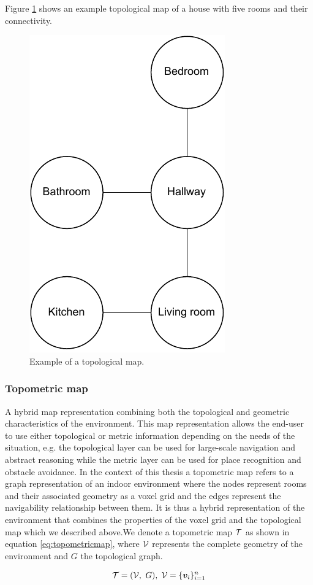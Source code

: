 Figure \ref{fig:topomap} shows an example topological map of a house with five rooms and their connectivity.

\begin{figure}[h]
    \centering
    \includegraphics*[width=.3\textwidth]{./fig/topological_map.pdf}
    \caption{Example of a topological map.}
    \label{fig:topomap}
\end{figure}

\pagebreak

\subsubsection{Topometric map}
A hybrid map representation combining both the topological and geometric characteristics of the environment. This map representation allows the end-user to use either topological or metric information depending on the needs of the situation, e.g. the topological layer can be used for large-scale navigation and abstract reasoning while the metric layer can be used for place recognition and obstacle avoidance. In the context of this thesis a topometric map refers to a graph representation of an indoor environment where the nodes represent rooms and their associated geometry as a voxel grid and the edges represent the navigability relationship between them. It is thus a hybrid representation of the environment that combines the properties of the voxel grid and the topological map which we described above.We denote a topometric map \(\mathcal{T}\) as shown in equation \ref{eq:topometricmap}, where \(\mathcal{V}\) represents the complete geometry of the environment and \(G\) the topological graph.

\begin{equation}
    \label{eq:topometricmap}
    \topometricmap = (\voxelgrid,\ G),\ \voxelgrid=\{\voxel_{i}\}_{i=1}^{n}
\end{equation}

